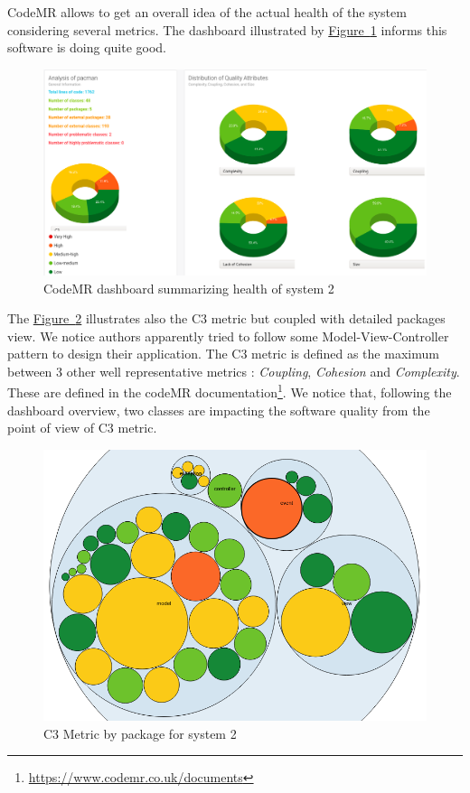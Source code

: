 \documentclass[]{article}
\newcommand{\wordlink}[2]{\hyperref[#2]{#1~\ref{#2}}}
\begin{document}
CodeMR allows to get an overall idea of the actual health of the system considering several metrics. The dashboard illustrated by \wordlink{Figure}{fig:S2_codeMR_dashboard} informs this software is doing quite good.

\begin{figure}[h]
\includegraphics[width=\linewidth]{S2-codeMR_dashboard}
\caption{CodeMR dashboard summarizing health of system 2}
\label{fig:S2_codeMR_dashboard}
\end{figure}

\newpage

The \wordlink{Figure}{fig:S2_codeMR_packages} illustrates also the C3 metric but coupled with detailed packages view. We notice authors apparently tried to follow some Model-View-Controller pattern to design their application. The C3 metric is defined as the maximum between 3 other well representative metrics : \textit{Coupling}, \textit{Cohesion} and \textit{Complexity}. These are defined in the codeMR documentation\footnote{\url{https://www.codemr.co.uk/documents}}. We notice that, following the dashboard overview, two classes are impacting the software quality from the point of view of C3 metric.
\vspace{0.2cm}
\begin{figure}[h]
\centering
\includegraphics[width=0.8\linewidth]{S2-codeMR_packages}
\caption{C3 Metric by package for system 2}
\label{fig:S2_codeMR_packages}
\end{figure}
\end{document}
